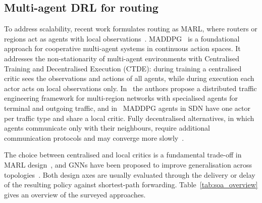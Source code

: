 \documentclass[10pt,journal,comsoc]{IEEEtran}
\begin{document}
\subsection{Multi-agent DRL for routing}
To address scalability, recent work formulates routing as MARL, where routers or regions act as agents with local observations~\cite{xiao2021leveraging,feriani2021single}. MADDPG~\cite{lowe2017multi} is a foundational approach for cooperative multi-agent systems in continuous action spaces. It addresses the non-stationarity of multi-agent environments with Centralised Training and Decentralised Execution (CTDE): during training a centralised critic sees the observations and actions of all agents, while during execution each actor acts on local observations only. In~\cite{geng2020multi} the authors propose a distributed traffic engineering framework for multi-region networks with specialised agents for terminal and outgoing traffic, and in~\cite{tong2023intelligent} MADDPG agents in SDN have one actor per traffic type and share a local critic. Fully decentralised alternatives, in which agents communicate only with their neighbours, require additional communication protocols and may converge more slowly~\cite{feriani2021single,wang2024scheduling,li2022applications,zhao2020improving,kuang2025rs}.

The choice between centralised and local critics is a fundamental trade-off in MARL design~\cite{lyu2023centralized,lyu2021contrasting}, and GNNs have been proposed to improve generalisation across topologies~\cite{bhavanasi2022routing,bernardez2023magnneto,li2023gappo,ma2024routing}. Both design axes are usually evaluated through the delivery or delay of the resulting policy against shortest-path forwarding. Table~\ref{tab:soa_overview} gives an overview of the surveyed approaches.
\end{document}
